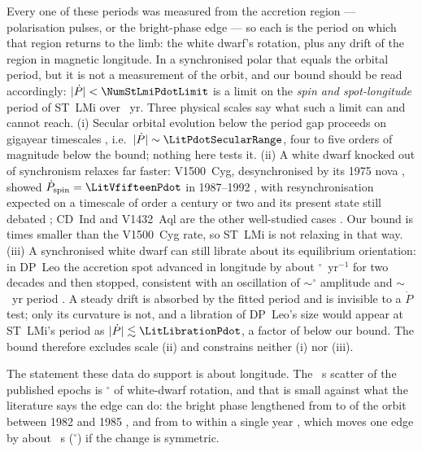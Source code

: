 Every one of these periods was measured from the accretion region ---
polarisation pulses, or the bright-phase edge --- so each is the period on
which that region returns to the limb: the white dwarf's rotation, plus any
drift of the region in magnetic longitude.  In a synchronised polar that
equals the orbital period, but it is not a measurement of the orbit, and
our bound should be read accordingly: $|\dot{P}| < \NumStLmiPdotLimit$ is a
limit on the \emph{spin and spot-longitude} period of ST~LMi over
\NumStLmiEpochSpanYears{}~yr.  Three physical scales say what such a limit
can and cannot reach.  (i) Secular orbital evolution below the period gap
proceeds on gigayear timescales \citep{knigge2011}, i.e.\
$|\dot{P}| \sim \LitPdotSecularRange$, four to five orders of magnitude
below the bound; nothing here tests it.  (ii) A white dwarf knocked out of
synchronism relaxes far faster: V1500~Cyg, desynchronised by its 1975 nova
\citep{stockman1988, schmidt1991}, showed
$\dot{P}_{\rm spin} = \LitVfifteenPdot$ in 1987--1992 \citep{schmidt1995},
with resynchronisation expected on a timescale of order a century or two
\citep{schmidt1995, campbell1999} and its present state still debated
\citep{harrison2016, harrison2018, pavlenko2018}; CD~Ind and V1432~Aql are
the other well-studied cases \citep{myers2017, staubert2003}.  Our bound is
\LitVfifteenOverBound{} times smaller than the V1500~Cyg rate, so ST~LMi is
not relaxing in that way.  (iii) A synchronised white dwarf can still
librate about its equilibrium orientation: in DP~Leo the accretion spot
advanced in longitude by about \LitDpLeoRateDegYr$^{\circ}$~yr$^{-1}$ for
two decades and then stopped, consistent with an oscillation of
$\sim$\LitDpLeoAmpDeg$^{\circ}$ amplitude and $\sim$\LitDpLeoPeriodYr~yr
period \citep{beuermann2014}.  A steady drift is absorbed by the fitted
period and is invisible to a $\dot{P}$ test; only its curvature is not, and
a libration of DP~Leo's size would appear at ST~LMi's period as
$|\dot{P}| \lesssim \LitLibrationPdot$, a factor of
\LitBoundOverLibration{} below our bound.  The bound therefore excludes
scale (ii) and constrains neither (i) nor (iii).

The statement these data do support is about longitude.  The
\NumStLmiOcRmsS{}~s scatter of the published epochs is
\LitStLmiRmsDeg$^{\circ}$ of white-dwarf rotation, and that is small
against what the literature says the edge can do: the bright phase
lengthened from \LitStLmiDurCropperEarly{} to \LitStLmiDurCropperLate{} of
the orbit between 1982 and 1985 \citep{cropper1986}, and from
\LitStLmiDurBaileyEarly{} to \LitStLmiDurBaileyLate{} within a single year
\citep{bailey1985}, which moves one edge by about \LitStLmiSeasonShiftS{}~s
(\LitStLmiSeasonShiftDeg$^{\circ}$) if the change is symmetric.

